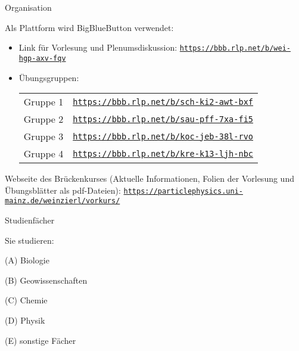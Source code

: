 \documentclass[german]{beamer}
\begin{document}
\begin{frame}{Organisation}

Als \alert{Plattform} wird \alert{BigBlueButton} verwendet:

\begin{itemize}
\item Link f\"ur Vorlesung und Plenumsdiskussion:
\href{https://bbb.rlp.net/b/wei-hgp-axv-fqv}{\footnotesize \texttt{https://bbb.rlp.net/b/wei-hgp-axv-fqv}}

\item \"Ubungsgruppen:
\begin{tabular}{ll}
 Gruppe 1 & \href{https://bbb.rlp.net/b/sch-ki2-awt-bxf}{\footnotesize \texttt{https://bbb.rlp.net/b/sch-ki2-awt-bxf}} \\
 Gruppe 2 & \href{https://bbb.rlp.net/b/sau-pff-7xa-fi5}{\footnotesize \texttt{https://bbb.rlp.net/b/sau-pff-7xa-fi5}} \\
 Gruppe 3 & \href{https://bbb.rlp.net/b/koc-jeb-38l-rvo}{\footnotesize \texttt{https://bbb.rlp.net/b/koc-jeb-38l-rvo}} \\
 Gruppe 4 & \href{https://bbb.rlp.net/b/kre-k13-ljh-nbc}{\footnotesize \texttt{https://bbb.rlp.net/b/kre-k13-ljh-nbc}} \\
\end{tabular}

\end{itemize}

\vspace*{10mm}

Webseite des Br\"uckenkurses
(\alert{Aktuelle Informationen}, \alert{Folien} der Vorlesung und \alert{\"Ubungsbl\"atter} als pdf-Dateien):
\href{https://particlephysics.uni-mainz.de/weinzierl/vorkurs/}{\footnotesize \texttt{https://particlephysics.uni-mainz.de/weinzierl/vorkurs/}}

\end{frame}

\begin{frame}{Studienf\"acher}

Sie studieren:
\begin{description}
\item{(A)} Biologie
\item{(B)} Geowissenschaften
\item{(C)} Chemie
\item{(D)} Physik
\item{(E)} sonstige F\"acher
\end{description}

\end{frame}
\end{document}
